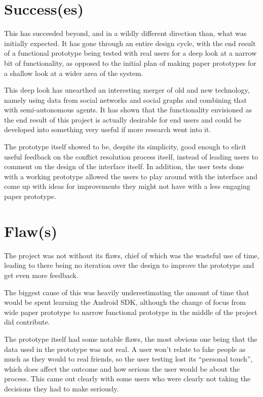 \documentclass[a4paper,11pt]{report}
\begin{document}
\section{Success(es)}

This has succeeded beyond, and in a wildly different direction than, what was
initially expected. It has gone through an entire design cycle, with the end
result of a functional prototype being tested with real users for a deep look at
a narrow bit of functionality, as opposed to the initial plan of making paper
prototypes for a shallow look at a wider area of the system.

This deep look has unearthed an interesting merger of old and new technology,
namely using data from social networks and social graphs and combining that with
semi-autonomous agents. It has shown that the functionality envisioned as the
end result of this project is actually desirable for end users and could be
developed into something very useful if more research went into it.

The prototype itself showed to be, despite its simplicity, good enough to elicit
useful feedback on the conflict resolution process itself, instead of leading
users to comment on the design of the interface itself. In addition, the user
tests done with a working prototype allowed the users to play around with the
interface and come up with ideas for improvements they might not have with a
less engaging paper prototype.

\section{Flaw(s)}

The project was not without its flaws, chief of which was the wasteful use of
time, leading to there being no iteration over the design to improve the
prototype and get even more feedback.

The biggest cause of this was heavily underestimating the amount of time that
would be spent learning the Android SDK, although the change of focus from wide
paper prototype to narrow functional prototype in the middle of the project did
contribute.

The prototype itself had some notable flaws, the most obvious one being that the
data used in the prototype was not real. A user won't relate to fake people as
much as they would to real friends, so the user testing lost its ``personal
touch'', which does affect the outcome and how serious the user would be about
the process. This came out clearly with some users who were clearly not taking
the decisions they had to make seriously.
\end{document}
